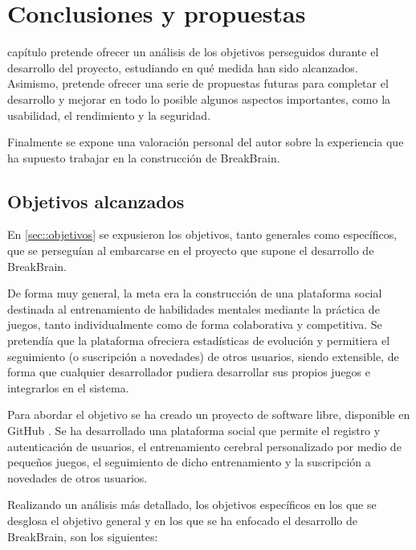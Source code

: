 \chapter{Conclusiones y propuestas}
\label{chap:conclusiones}

 capítulo pretende ofrecer un análisis de los objetivos perseguidos durante el desarrollo del proyecto, estudiando en qué medida han sido alcanzados. Asimismo, pretende ofrecer una serie de propuestas futuras para completar el desarrollo y mejorar en todo lo posible algunos aspectos importantes, como la usabilidad, el rendimiento y la seguridad.

Finalmente se expone una valoración personal del autor sobre la experiencia que ha supuesto trabajar en la construcción de BreakBrain.

\section{Objetivos alcanzados}

En \ref{sec::objetivos} se expusieron los objetivos, tanto generales como específicos, que se perseguían al embarcarse en el proyecto que supone el desarrollo de BreakBrain.

De forma muy general, la meta era la construcción de una plataforma social destinada al entrenamiento de habilidades mentales mediante la práctica de juegos, tanto individualmente como de forma colaborativa y competitiva. Se pretendía que la plataforma ofreciera estadísticas de evolución y permitiera el seguimiento (o suscripción a novedades) de otros usuarios, siendo extensible, de forma que cualquier desarrollador pudiera desarrollar sus propios juegos e integrarlos en el sistema.

Para abordar el objetivo se ha creado un proyecto de software libre, disponible en GitHub \cite{github}. Se ha desarrollado una plataforma social que permite el registro y autenticación de usuarios, el entrenamiento cerebral personalizado por medio de pequeños juegos, el seguimiento de dicho entrenamiento y la suscripción a novedades de otros usuarios.

Realizando un análisis más detallado, los objetivos específicos en los que se desglosa el objetivo general y en los que se ha enfocado el desarrollo de BreakBrain, son los siguientes:

